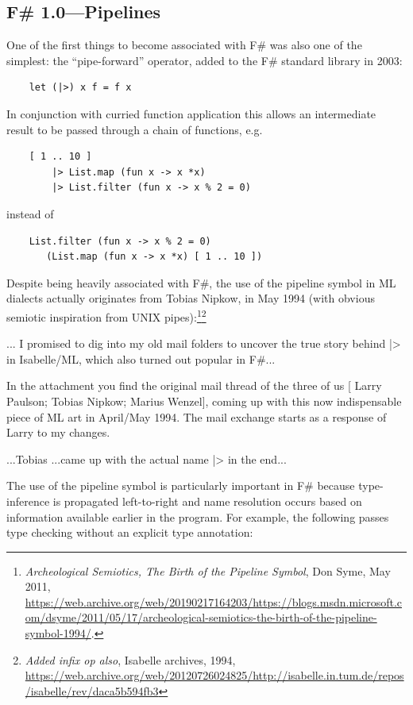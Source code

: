 \documentclass[acmsmall]{acmart}\settopmatter{}
\begin{document}
\subsection*{F\# 1.0---Pipelines}

One of the first things to become associated with F\# was also one of the simplest: the “pipe-forward” operator, added to the F\# standard library in 2003:
\begin{verbatim}
    let (|>) x f = f x
\end{verbatim}
In conjunction with curried function application this allows an intermediate result to be passed through a chain of functions, e.g.
\begin{verbatim}
    [ 1 .. 10 ] 
        |> List.map (fun x -> x *x) 
        |> List.filter (fun x -> x % 2 = 0)
\end{verbatim}
instead of 
\begin{verbatim}
    List.filter (fun x -> x % 2 = 0) 
       (List.map (fun x -> x *x) [ 1 .. 10 ])
\end{verbatim}
Despite being heavily associated with F\#, the use of the pipeline symbol in ML dialects actually originates from Tobias Nipkow, in
May 1994 (with obvious semiotic inspiration from UNIX pipes):\footnote{\textit{Archeological Semiotics, The Birth of the Pipeline Symbol}, Don
Syme, May 2011, \url{https://web.archive.org/web/20190217164203/https://blogs.msdn.microsoft.com/dsyme/2011/05/17/archeological-semiotics-the-birth-of-the-pipeline-symbol-1994/}.}\footnote{\textit{Added infix op also}, Isabelle archives, 1994, \url{https://web.archive.org/web/20120726024825/http://isabelle.in.tum.de/repos/isabelle/rev/daca5b594fb3}}
\begin{verbquote}
... I promised to dig into my old mail folders to uncover the true story behind |> in Isabelle/ML, which also turned out popular in F#...

In the attachment you find the original mail thread of the three of us [ Larry Paulson; Tobias Nipkow; Marius Wenzel], coming up with this now indispensable piece of ML art in April/May 1994. The mail exchange starts as a response of Larry to my changes.  

...Tobias ...came up with the actual name |> in the end...
\end{verbquote}
The use of the pipeline symbol is particularly important in F\# because type-inference is propagated left-to-right and name resolution occurs based on information available earlier in the program.  For example, the following passes type checking without an explicit type annotation:
\end{document}
